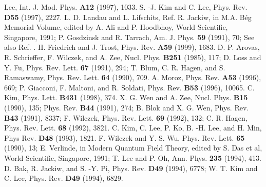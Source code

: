 \documentclass[a4paper,aps,eqsecnum,preprint,preprintnumbers,12pt]{revtex4}
\begin{document}
\begin{thebibliography}{12345}
Lee, Int. J. Mod. Phys. {\bf A12} (1997), 1033.
 S. -J. Kim and C. Lee, Phys. Rev. {\bf D55} (1997),
2227.
 L. D. Landau and L. Lifschits, Ref. \cite{langer}
 R. Jackiw, in M.A. B\'{e}g Memorial Volume,
edited by A. Ali and P. Hoodbhoy, World Scientific, Singapore,
1991; P. Gosdzinsk and R. Tarrach, Am. J. Phys. {\bf 59} (1991),
70; See also Ref. \cite{albeverio}.
 H. Friedrich and J. Trost, Phys. Rev. {\bf
A59} (1999), 1683.
 D. P. Arovas, R. Schrieffer, F. Wilczek, and A.
Zee, Nucl. Phys. {\bf B251} (1985), 117; D. Loss and Y. Fu, Phys.
Rev. Lett. {\bf 67} (1991), 294; T. Blum, C. R. Hagen, and S.
Ramaswamy, Phys. Rev. Lett. {\bf 64} (1990), 709.
 A. Moroz, Phys. Rev. {\bf A53} (1996), 669; P.
Giacconi, F. Maltoni, and R. Soldati, Phys. Rev. {\bf B53} (1996),
10065.
 C. Kim, Phys. Lett. {\bf B431} (1998), 374.
 X. G. Wen and A. Zee, Nucl. Phys. {\bf B15} (1990),
135; Phys. Rev. {\bf B44} (1991), 274; B. Blok and X. G. Wen,
Phys. Rev. {\bf B43} (1991), 8337; F. Wilczek, Phys. Rev. Lett.
{\bf 69} (1992), 132; C. R. Hagen, Phys. Rev. Lett. {\bf 68}
(1992), 3821.
 C. Kim, C. Lee, P. Ko, B. -H. Lee, and H. Min, Phys
Rev. {\bf D48} (1993), 1821.
 F. Wilczek and Y. S. Wu, Phys. Rev. Lett. {\bf
65} (1990), 13; E. Verlinde, in Modern Quantum Field Theory,
edited by S. Das et al, World Scientific, Singapore, 1991; T. Lee
and P. Oh, Ann. Phys. {\bf 235} (1994), 413.
 D. Bak, R. Jackiw, and S. -Y. Pi, Phys. Rev. {\bf
D49} (1994), 6778; W. T. Kim and C. Lee, Phys. Rev. {\bf D49}
(1994), 6829.
\end{thebibliography}
\end{document}
